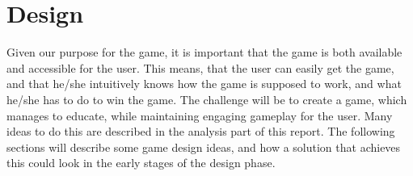 \chapter{Design}
\label{cha:design}

Given our purpose for the game, it is important that the game is both available and accessible for the user.
This means, that the user can easily get the game, and that he/she intuitively knows how the game is supposed to work, and what he/she has to do to win the game.
The challenge will be to create a game, which manages to educate, while maintaining engaging gameplay for the user.
Many ideas to do this are described in the analysis part of this report.
The following sections will describe some game design ideas, and how a solution that achieves this could look in the early stages of the design phase.\newpage

%




